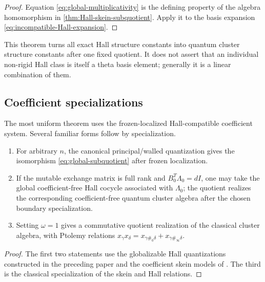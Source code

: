 \begin{proof}
Equation \eqref{eq:global-multiplicativity} is the defining property of the
algebra homomorphism in \cref{thm:Hall-skein-subquotient}.  Apply it to the
basis expansion \eqref{eq:incompatible-Hall-expansion}.
\end{proof}

This theorem turns all exact Hall structure constants into quantum cluster
structure constants after one fixed quotient.  It does not assert that an
individual non-rigid Hall class is itself a theta basis element; generally it
is a linear combination of them.

\subsection{Coefficient specializations}

The most uniform theorem uses the frozen-localized Hall-compatible coefficient
system.  Several familiar forms follow by specialization.

\begin{corollary}
\label{cor:coefficient-regimes}
\begin{enumerate}[label=(\roman*),leftmargin=2.3em]
\item For arbitrary $n$, the canonical principal/walled quantization gives
      the isomorphism \eqref{eq:global-subquotient} after frozen localization.
\item If the mutable exchange matrix is full rank and
      $B_0^T\Lambda_0=dI$, one may take the global coefficient-free Hall
      cocycle associated with $\Lambda_0$; the quotient realizes the
      corresponding coefficient-free quantum cluster algebra after the chosen
      boundary specialization.
\item Setting $\omega=1$ gives a commutative quotient realization of the
      classical cluster algebra, with Ptolemy relations
      $x_\gamma x_\delta=x_{\gamma\#_0\delta}+x_{\gamma\#_\infty\delta}$.
\end{enumerate}
\end{corollary}

\begin{proof}
The first two statements use the globalizable Hall quantizations constructed
in the preceding paper and the coefficient skein models of
\cite{IshibashiKanoYuasa}.  The third is the classical specialization of the
skein and Hall relations.
\end{proof}

